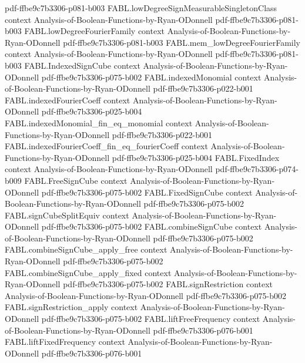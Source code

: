 \begin{theorem}
  {pdf-ffbe9c7b3306-p081-b003}
\proofstep
  {FABL.lowDegreeSignMeasurableSingletonClass}
  {context}
  {Analysis-of-Boolean-Functions-by-Ryan-ODonnell}
  {pdf-ffbe9c7b3306-p081-b003}
\proofstep
  {FABL.lowDegreeFourierFamily}
  {context}
  {Analysis-of-Boolean-Functions-by-Ryan-ODonnell}
  {pdf-ffbe9c7b3306-p081-b003}
\proofstep
  {FABL.mem_lowDegreeFourierFamily}
  {context}
  {Analysis-of-Boolean-Functions-by-Ryan-ODonnell}
  {pdf-ffbe9c7b3306-p081-b003}
\proofstep
  {FABL.IndexedSignCube}
  {context}
  {Analysis-of-Boolean-Functions-by-Ryan-ODonnell}
  {pdf-ffbe9c7b3306-p075-b002}
\proofstep
  {FABL.indexedMonomial}
  {context}
  {Analysis-of-Boolean-Functions-by-Ryan-ODonnell}
  {pdf-ffbe9c7b3306-p022-b001}
\proofstep
  {FABL.indexedFourierCoeff}
  {context}
  {Analysis-of-Boolean-Functions-by-Ryan-ODonnell}
  {pdf-ffbe9c7b3306-p025-b004}
\proofstep
  {FABL.indexedMonomial_fin_eq_monomial}
  {context}
  {Analysis-of-Boolean-Functions-by-Ryan-ODonnell}
  {pdf-ffbe9c7b3306-p022-b001}
\proofstep
  {FABL.indexedFourierCoeff_fin_eq_fourierCoeff}
  {context}
  {Analysis-of-Boolean-Functions-by-Ryan-ODonnell}
  {pdf-ffbe9c7b3306-p025-b004}
\proofstep
  {FABL.FixedIndex}
  {context}
  {Analysis-of-Boolean-Functions-by-Ryan-ODonnell}
  {pdf-ffbe9c7b3306-p074-b009}
\proofstep
  {FABL.FreeSignCube}
  {context}
  {Analysis-of-Boolean-Functions-by-Ryan-ODonnell}
  {pdf-ffbe9c7b3306-p075-b002}
\proofstep
  {FABL.FixedSignCube}
  {context}
  {Analysis-of-Boolean-Functions-by-Ryan-ODonnell}
  {pdf-ffbe9c7b3306-p075-b002}
\proofstep
  {FABL.signCubeSplitEquiv}
  {context}
  {Analysis-of-Boolean-Functions-by-Ryan-ODonnell}
  {pdf-ffbe9c7b3306-p075-b002}
\proofstep
  {FABL.combineSignCube}
  {context}
  {Analysis-of-Boolean-Functions-by-Ryan-ODonnell}
  {pdf-ffbe9c7b3306-p075-b002}
\proofstep
  {FABL.combineSignCube_apply_free}
  {context}
  {Analysis-of-Boolean-Functions-by-Ryan-ODonnell}
  {pdf-ffbe9c7b3306-p075-b002}
\proofstep
  {FABL.combineSignCube_apply_fixed}
  {context}
  {Analysis-of-Boolean-Functions-by-Ryan-ODonnell}
  {pdf-ffbe9c7b3306-p075-b002}
\proofstep
  {FABL.signRestriction}
  {context}
  {Analysis-of-Boolean-Functions-by-Ryan-ODonnell}
  {pdf-ffbe9c7b3306-p075-b002}
\proofstep
  {FABL.signRestriction_apply}
  {context}
  {Analysis-of-Boolean-Functions-by-Ryan-ODonnell}
  {pdf-ffbe9c7b3306-p075-b002}
\proofstep
  {FABL.liftFreeFrequency}
  {context}
  {Analysis-of-Boolean-Functions-by-Ryan-ODonnell}
  {pdf-ffbe9c7b3306-p076-b001}
\proofstep
  {FABL.liftFixedFrequency}
  {context}
  {Analysis-of-Boolean-Functions-by-Ryan-ODonnell}
  {pdf-ffbe9c7b3306-p076-b001}

\end{theorem}
